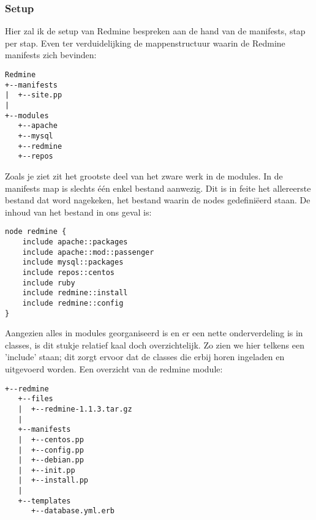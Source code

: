 \subsubsection{Setup}
Hier zal ik de setup van Redmine bespreken aan de hand van de manifests, stap per stap. Even ter verduidelijking de mappenstructuur waarin de Redmine manifests zich bevinden:
%
\begin{code}
\begin{lstlisting}
Redmine
+--manifests
|  +--site.pp
|
+--modules
   +--apache
   +--mysql
   +--redmine
   +--repos
\end{lstlisting}
\end{code}
%
Zoals je ziet zit het grootste deel van het zware werk in de modules. In de manifests map is slechts \'e\'en enkel bestand aanwezig. Dit is in feite het allereerste bestand dat word nagekeken, het bestand waarin de nodes gedefini\"eerd staan. De inhoud van het bestand in ons geval is:
%
\begin{code}
\begin{lstlisting}
node redmine {
	include apache::packages
	include apache::mod::passenger
	include mysql::packages
	include repos::centos
	include ruby
	include redmine::install
	include redmine::config
}
\end{lstlisting}
\end{code}
%
Aangezien alles in modules georganiseerd is en er een nette onderverdeling is in classes, is dit stukje relatief kaal doch overzichtelijk. Zo zien we hier telkens een 'include' staan; dit zorgt ervoor dat de classes die erbij horen ingeladen en uitgevoerd worden.
%
Een overzicht van de redmine module:
%
\begin{code}
\begin{lstlisting}
+--redmine
   +--files
   |  +--redmine-1.1.3.tar.gz
   |
   +--manifests
   |  +--centos.pp
   |  +--config.pp
   |  +--debian.pp
   |  +--init.pp
   |  +--install.pp
   |
   +--templates
      +--database.yml.erb
\end{lstlisting}
\end{code}
%
